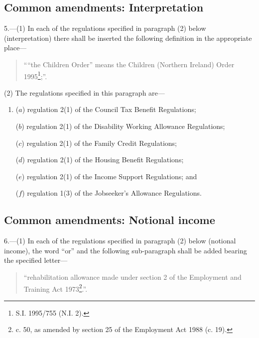 \documentclass[12pt,a4paper]{article}
\begin{document}
\subsection[5. Common amendments: Interpretation]{Common amendments: Interpretation}

5.---(1)  In each of the regulations specified in paragraph (2) below (interpretation) there shall be inserted the following definition in the appropriate place—
\begin{quotation}
““the Children Order” means the Children (Northern Ireland) Order 1995\footnote{\frenchspacing S.I. 1995/755 (N.I. 2).};”.
\end{quotation}

(2) The regulations specified in this paragraph are—
\begin{enumerate}\item[]
($a$) regulation 2(1) of the Council Tax Benefit Regulations;

($b$) regulation 2(1) of the Disability Working Allowance Regulations;

($c$) regulation 2(1) of the Family Credit Regulations;

($d$) regulation 2(1) of the Housing Benefit Regulations;

($e$) regulation 2(1) of the Income Support Regulations; and

($f$) regulation 1(3) of the Jobseeker’s Allowance Regulations.
\end{enumerate}

\subsection[6. Common amendments: Notional income]{Common amendments: Notional income}

6.---(1)  In each of the regulations specified in paragraph (2) below (notional income), the word “or” and the following sub-paragraph shall be added bearing the specified letter—
\begin{quotation}
    “rehabilitation allowance made under section 2 of the Employment and Training Act 1973\footnote{ c. 50, as amended by section 25 of the Employment Act 1988 (c. 19).}.”. 
\end{quotation}
\end{document}
